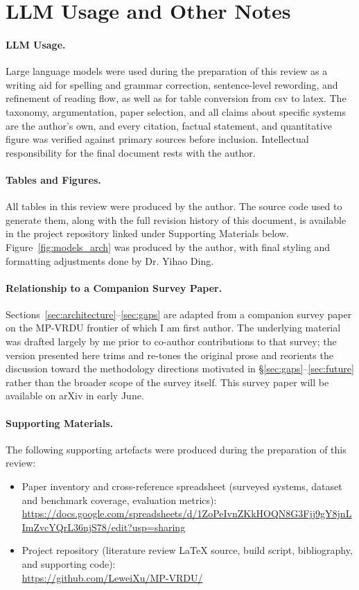 \documentclass[11pt]{article}
\begin{document}
\section*{LLM Usage and Other Notes}

\paragraph{LLM Usage.}
Large language models were used during the preparation of this review as a writing aid for spelling and grammar correction, sentence-level rewording, and refinement of reading flow, as well as for table conversion from csv to latex. The taxonomy, argumentation, paper selection, and all claims about specific systems are the author's own, and every citation, factual statement, and quantitative figure was verified against primary sources before inclusion. Intellectual responsibility for the final document rests with the author.

\paragraph{Tables and Figures.}
All tables in this review were produced by the author. The source code used to generate them, along with the full revision history of this document, is available in the project repository linked under Supporting Materials below. Figure~\ref{fig:models_arch} was produced by the author, with final styling and formatting adjustments done by Dr. Yihao Ding.

\paragraph{Relationship to a Companion Survey Paper.}
Sections~\ref{sec:architecture}--\ref{sec:gaps} are adapted from a companion survey paper on the MP-VRDU frontier of which I am first author. The underlying material was drafted largely by me prior to co-author contributions to that survey; the version presented here trims and re-tones the original prose and reorients the discussion toward the methodology directions motivated in \S\ref{sec:gaps}--\ref{sec:future} rather than the broader scope of the survey itself. This survey paper will be available on arXiv in early June.

\paragraph{Supporting Materials.}
The following supporting artefacts were produced during the preparation of this review:
\begin{itemize}
  \item Paper inventory and cross-reference spreadsheet (surveyed systems, dataset and benchmark coverage, evaluation metrics): \\ \url{https://docs.google.com/spreadsheets/d/1ZoPeIvnZKkHOQN8G3Fjj9gY8jnLImZvcYQrL36njS78/edit?usp=sharing}
  \item Project repository (literature review \LaTeX{} source, build script, bibliography, and supporting code): \\ \url{https://github.com/LeweiXu/MP-VRDU/}
\end{itemize}







\appendix
\end{document}
